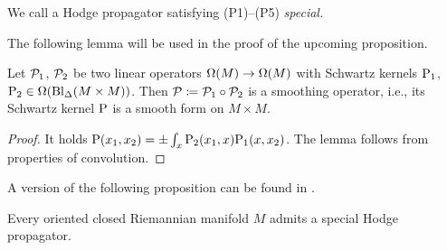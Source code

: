 \documentclass[\MainFolder/Text.tex]{subfiles}
\begin{document}
\begin{Definition}
	We call a Hodge propagator satisfying (P1)--(P5) \emph{special.}
\end{Definition}


The following lemma will be used in the proof of the upcoming proposition.
\begin{Lemma}\label{Lem:Smoothing}
Let $\mathcal{P}_1$, $\mathcal{P}_2$ be two linear operators $\Omega(M) \rightarrow \Omega(M)$ with Schwartz kernels $\mathrm{P}_1$, $\mathrm{P}_2 \in \Omega(\mathrm{Bl}_\Delta(M\times M))$.
Then $\mathcal{P}\coloneqq \mathcal{P}_1 \circ \mathcal{P}_2$ is a smoothing operator, i.e., its Schwartz kernel $\mathrm{P}$ is a smooth form on $M\times M$. 
\end{Lemma}
\begin{proof}
It holds $\mathrm{P}(x_1,x_2) = \pm \int_x \mathrm{P}_2(x_1,x) \mathrm{P}_1(x,x_2)$.
The lemma follows from properties of convolution.
\end{proof}

A version of the following proposition can be found in \cite{Mnev2009}.
\begin{Proposition} \label{Prop:ExistenceG}
Every oriented closed Riemannian manifold $M$ admits a special Hodge propagator.
\end{Proposition}
\end{document}
